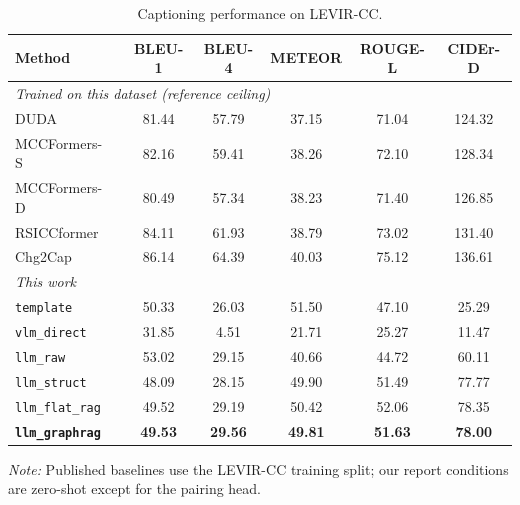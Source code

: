 \begin{table}[t]
\centering
\caption{Captioning performance on LEVIR-CC.}
\label{tab:levir_cc_caption}
\setlength{\tabcolsep}{3pt}
\scriptsize
\begin{tabular}{lccccc}
\toprule
Method & BLEU-1 & BLEU-4 & METEOR & ROUGE-L & CIDEr-D \\
\midrule
\multicolumn{6}{l}{\emph{Trained on this dataset (reference ceiling)}} \\
DUDA~\cite{park2019robust} & 81.44 & 57.79 & 37.15 & 71.04 & 124.32 \\
MCCFormers-S~\cite{qiu2021describing} & 82.16 & 59.41 & 38.26 & 72.10 & 128.34 \\
MCCFormers-D~\cite{qiu2021describing} & 80.49 & 57.34 & 38.23 & 71.40 & 126.85 \\
RSICCformer~\cite{liu2022remote} & 84.11 & 61.93 & 38.79 & 73.02 & 131.40 \\
Chg2Cap~\cite{chang2023changes} & 86.14 & 64.39 & 40.03 & 75.12 & 136.61 \\
\midrule
\multicolumn{6}{l}{\emph{This work}} \\
\texttt{template} & 50.33 & 26.03 & 51.50 & 47.10 & 25.29 \\
\texttt{vlm\_direct} & 31.85 & 4.51 & 21.71 & 25.27 & 11.47 \\
\texttt{llm\_raw} & 53.02 & 29.15 & 40.66 & 44.72 & 60.11 \\
\texttt{llm\_struct} & 48.09 & 28.15 & 49.90 & 51.49 & 77.77 \\
\texttt{llm\_flat\_rag} & 49.52 & 29.19 & 50.42 & 52.06 & 78.35 \\
\textbf{\texttt{llm\_graphrag}} & \textbf{49.53} & \textbf{29.56} & \textbf{49.81} & \textbf{51.63} & \textbf{78.00} \\
\bottomrule
\end{tabular}
\vspace{1pt}
\parbox{\columnwidth}{\scriptsize\textit{Note:} Published baselines use the LEVIR-CC training split; our report conditions are zero-shot except for the pairing head.}
\end{table}
